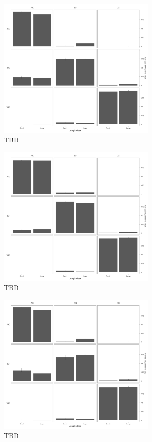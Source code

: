 \documentclass{article}
\begin{document}
\begin{figure}[htb]
    \centering
    \includegraphics[width = 0.7\textwidth]{bar-regions-3-size}
    \caption{TBD}
    \label{fig:bar-regions-3-size}
\end{figure}

\begin{figure}[htb]
    \centering
    \includegraphics[width = 0.7\textwidth]{bar-regions-3-size-no-duration-constraint}
    \caption{TBD}
    \label{fig:bar-regions-3-size-no-duration-constraint}
\end{figure}

\begin{figure}[htb]
    \centering
    \includegraphics[width = 0.7\textwidth]{bar-regions-3-size-no-recovery-transition}
    \caption{TBD}
    \label{fig:bar-regions-3-size-no-recovery-transition}
\end{figure}




\newpage


\end{document}
